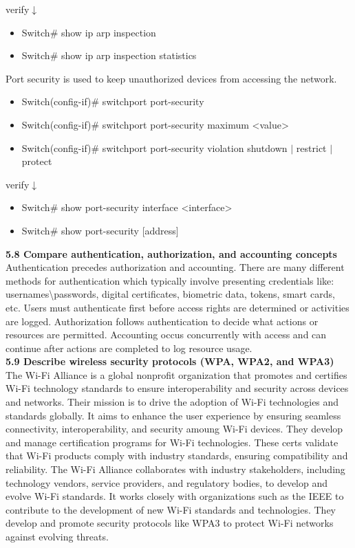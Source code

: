 \documentclass{article}
\begin{document}
verify$\downarrow$
\begin{itemize}
\item Switch\# show ip arp inspection
\item Switch\# show ip arp inspection statistics
\end{itemize}
		
Port security is used to keep unauthorized devices from accessing the network.
\begin{itemize}
\item Switch(config-if)\# switchport port-security
\item Switch(config-if)\# switchport port-security maximum \textless value\textgreater
\item Switch(config-if)\# switchport port-security violation {shutdown $\mid$ restrict $\mid$ protect}
\end{itemize}

verify$\downarrow$
\begin{itemize}
\item Switch\# show port-security interface \textless interface\textgreater
\item Switch\# show port-security [address]
\end{itemize}
  
\textbf{5.8 Compare authentication, authorization, and accounting concepts}\\

	Authentication precedes authorization and accounting. There are many different methods for authentication which typically involve presenting credentials like: usernames\textbackslash{}passwords, digital certificates, biometric data, tokens, smart cards, etc. Users must authenticate first before access rights are determined or activities are logged. Authorization follows authentication to decide what actions or resources are permitted. Accounting occus concurrently with access and can continue after actions are completed to log resource usage.\\
  
\textbf{5.9 Describe wireless security protocols (WPA, WPA2, and WPA3)}\\
	
	The Wi-Fi Alliance is a global nonprofit organization that promotes and certifies Wi-Fi technology standards to ensure interoperability and security across devices and networks. Their mission is to drive the adoption of Wi-Fi technologies and standards globally. It aims to enhance the user experience by ensuring seamless connectivity, interoperability, and security amoung Wi-Fi devices. They develop and manage certification programs for Wi-Fi technologies. These certs validate that Wi-Fi products comply with industry standards, ensuring compatibility and reliability. The Wi-Fi Alliance collaborates with industry stakeholders, including technology vendors, service providers, and regulatory bodies, to develop and evolve Wi-Fi standards. It works closely with organizations such as the IEEE to contribute to the development of new Wi-Fi standards and technologies. They develop and promote security protocols like WPA3 to protect Wi-Fi networks against evolving threats.\\
\end{document}

